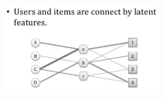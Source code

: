 \documentclass[dvips,11pt]{article}
\begin{document}
\begin{figure}[!ht]
	\centering
	\includegraphics[width=70mm]{latent}
\end{figure}


	
%



\end{document}
